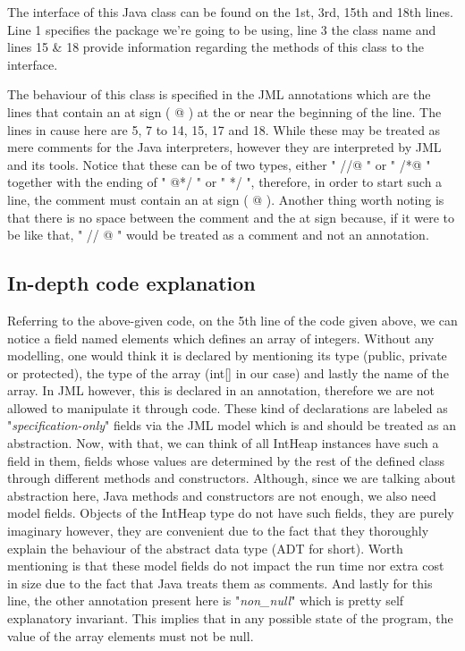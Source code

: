 \documentclass{article}
\begin{document}
The interface of this Java class can be found on the 1st, 3rd, 15th and 18th lines. Line 1 specifies the package we're going to be using, line 3 the class name and lines 15 \& 18 provide information regarding the methods of this class to the interface.

The behaviour of this class is specified in the JML annotations which are the lines that contain an at sign ( @ ) at the or near the beginning of the line. The lines in cause here are 5, 7 to 14, 15, 17 and 18. While these may be treated as mere comments for the Java interpreters, however they are interpreted by JML and its tools. Notice that these can be of two types, either " //@ " or " /*@ " together with the ending of " @*/ " or " */ ", therefore, in order to start such a line, the comment must contain an at sign ( @ ). Another thing worth noting is that there is no space between the comment and the at sign because, if it were to be like that, " // @ " would be treated as a comment and not an annotation.

\subsection{In-depth code explanation}
Referring to the above-given code, on the 5th line of the code given above, we can notice a field named elements which defines an array of integers. Without any modelling, one would think it is declared by mentioning its type (public, private or protected), the type of the array (int[] in our case) and lastly the name of the array. In JML however, this is declared in an annotation, therefore we are not allowed to manipulate it through code.
These kind of declarations are labeled as "\textit{specification-only}" fields via the JML model which is and should be treated as an abstraction. Now, with that, we can think of all IntHeap instances have such a field in them, fields whose values are determined by the rest of the defined class through different methods and constructors. Although, since we are talking about abstraction here, Java methods and constructors are not enough, we also need model fields. Objects of the IntHeap type do not have such fields, they are purely imaginary however, they are convenient due to the fact that they thoroughly explain the behaviour of the abstract data type (ADT for short). Worth mentioning is that these model fields do not impact the run time nor extra cost in size due to the fact that Java treats them as comments. And lastly for this line, the other annotation present here is "\textit{non\_null}" which is pretty self explanatory invariant. This implies that in any possible state of the program, the value of the array elements must not be null.
\end{document}
